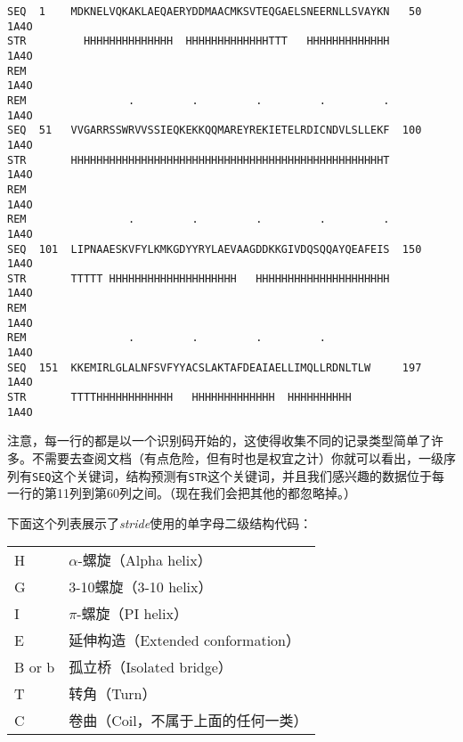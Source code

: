 \begin{lstlisting}
SEQ  1    MDKNELVQKAKLAEQAERYDDMAACMKSVTEQGAELSNEERNLLSVAYKN   50          1A4O
STR         HHHHHHHHHHHHHH  HHHHHHHHHHHHHTTT   HHHHHHHHHHHHH               1A4O
REM                                                                        1A4O
REM                .         .         .         .         .               1A4O
SEQ  51   VVGARRSSWRVVSSIEQKEKKQQMAREYREKIETELRDICNDVLSLLEKF  100          1A4O
STR       HHHHHHHHHHHHHHHHHHHHHHHHHHHHHHHHHHHHHHHHHHHHHHHHHT               1A4O
REM                                                                        1A4O
REM                .         .         .         .         .               1A4O
SEQ  101  LIPNAAESKVFYLKMKGDYYRYLAEVAAGDDKKGIVDQSQQAYQEAFEIS  150          1A4O
STR       TTTTT HHHHHHHHHHHHHHHHHHHH   HHHHHHHHHHHHHHHHHHHHH               1A4O
REM                                                                        1A4O
REM                .         .         .         .                         1A4O
SEQ  151  KKEMIRLGLALNFSVFYYACSLAKTAFDEAIAELLIMQLLRDNLTLW     197          1A4O
STR       TTTTHHHHHHHHHHHH   HHHHHHHHHHHHH  HHHHHHHHHH                     1A4O
\end{lstlisting}

注意，每一行的都是以一个识别码开始的，这使得收集不同的记录类型简单了许多。不需要去查阅文档（有点危险，但有时也是权宜之计）你就可以看出，一级序列有\verb|SEQ|这个关键词，结构预测有\verb|STR|这个关键词，并且我们感兴趣的数据位于每一行的第11列到第60列之间。（现在我们会把其他的都忽略掉。）

下面这个列表展示了\textit{stride}使用的单字母二级结构代码：

\begin{table}[!htbp]
  \begin{center}
  \begin{tabu} to 0.5\linewidth {X[1,l]X[2,l]}
  \toprule
  H & $\alpha$-螺旋（Alpha helix）\\
  G & 3-10螺旋（3-10 helix）\\
  I & $\pi$-螺旋（PI helix）\\
  E & 延伸构造（Extended conformation）\\
  B or b& 孤立桥（Isolated bridge）\\
  T & 转角（Turn）\\
  C & 卷曲（Coil，不属于上面的任何一类）\\
  \bottomrule
  \end{tabu}
  \end{center}
\end{table}

